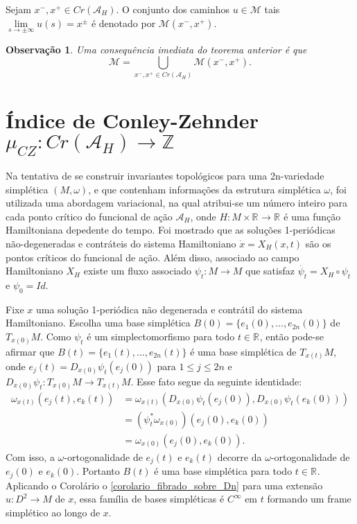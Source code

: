 \documentclass[12pt]{book}
\newtheorem{observacao}[teorema]{Observação}
\newcommand{\campohamiltoniano}[1]{X_{H}(#1)}
\newcommand{\campohamiltonianoabrev}{X_{H}}
\newcommand{\energiafinitaM}{\mathcal{M}}
\newcommand{\energiafinitaMconectante}{\energiafinitaM(x^{-}, x^{+})}
\newcommand{\espacotangenteponto}[2]{T_{#1}#2}
\newcommand{\funcionalH}{\mathcal{A}_{H}}
\newcommand{\iconleyabrev}{\mu_{CZ}}
\newcommand{\inteiros}{\mathbb{Z}}
\newcommand{\pontoscriticos}[1]{\textit{Cr}(#1)}
\newcommand{\real}[1]{\mathbb{R}^{#1}}
\newcommand{\reta}{\real{}}
\begin{document}
	Sejam $x^{-}, x^{+}\in \pontoscriticos{\funcionalH}$. O conjunto dos caminhos $u \in \energiafinitaM$ tais $\lim\limits_{s\to \pm \infty}u(s) = x^{\pm}$ é denotado por $\energiafinitaMconectante$.

	\begin{observacao}\label{observacao_uniao_orbitas_conectantes}
		Uma consequência imediata do teorema anterior é que 
		$$
		\energiafinitaM = \bigcup_{x^{-}, x^{+} \in \pontoscriticos{\funcionalH}} \energiafinitaMconectante.
		$$
	\end{observacao}
	
	
	
	\section{Índice de Conley-Zehnder $\iconleyabrev: \pontoscriticos{\funcionalH}\to \inteiros$}\label{secao_indice_conley}
	
	Na tentativa de se construir invariantes topológicos para uma 2n-variedade simplética $(M, \omega)$, e que contenham informações da estrutura simplética $\omega$, foi utilizada uma abordagem variacional, na qual atribui-se um número inteiro para cada ponto crítico do funcional de ação $\funcionalH$, onde $H: M\times \reta\to \reta$ é uma função Hamiltoniana depedente do tempo. Foi mostrado que as soluções 1-periódicas não-degeneradas e contráteis do sistema Hamiltoniano $\dot{x} = \campohamiltoniano{x, t}$ são os pontos críticos do funcional de ação. Além disso, associado ao campo Hamiltoniano $\campohamiltonianoabrev$ existe um fluxo associado $\psi_{t}:M\to M$ que satisfaz $\dot{\psi_{t}} =\campohamiltonianoabrev\circ\psi_{t}$ e $\psi_{0}=Id$.
	
	Fixe $x $ uma solução 1-periódica não degenerada e contrátil do sistema Hamiltoniano. Escolha uma base simplética $B(0) = \{e_{1}(0),\dots,e_{2n}(0)\}$ de $\espacotangenteponto{x(0)}{M}$. Como $\psi_{t}$ é um simplectomorfismo para todo $t\in \reta$, então pode-se afirmar que $B(t) = \{e_{1}(t), \dots, e_{2n}(t)\}$ é uma base simplética de $\espacotangenteponto{x(t)}{M}$, onde $e_{j}(t) = D_{x(0)}\psi_{t}(e_{j}(0))$ para $1\leq j \leq 2n$ e $D_{x(0)}\psi_{t}: \espacotangenteponto{x(0)}{M}\to \espacotangenteponto{x(t)}{M}$. Esse fato segue da seguinte identidade:
	$$
	\begin{aligned}
	\omega_{x(t)}(e_{j}(t), e_{k}(t))
	&=
	\omega_{x(t)}(D_{x(0)}\psi_{t}(e_{j}(0)), D_{x(0)}\psi_{t}(e_{k}(0)))
	\\
	&=	(\psi^{*}_{t}\omega_{x(0)})(e_{j}(0), e_{k}(0))
	\\
	&=	\omega_{x(0)}(e_{j}(0), e_{k}(0)).
	\end{aligned}
	$$
	Com isso, a $\omega$-ortogonalidade de $e_{j}(t)$ e $e_{k}(t)$ decorre da $\omega$-ortogonalidade de $e_{j}(0)$ e $e_{k}(0)$. Portanto $B(t)$ é uma base simplética para todo $t\in \reta$. Aplicando o Corolário o \ref{corolario_fibrado_sobre_Dn} para uma extensão $u:D^{2} \to M$ de $x$, essa família de bases simpléticas é $C^{\infty}$ em $t$ formando um frame simplético ao longo de $x$. 
	
\end{document}
